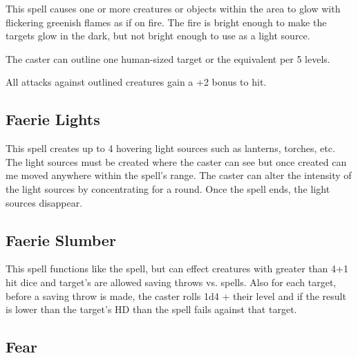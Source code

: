 \begin{multicols*}{2}
This spell causes one or more creatures or objects within the area to glow with flickering greenish flames as if on fire. The fire is bright enough to make the targets glow in the dark, but not bright enough to use as a light source.

The caster can outline one human-sized target or the equivalent per 5 levels.

All attacks against outlined creatures gain a +2 bonus to hit.

\subsection{Faerie Lights}\label{spell:Faerie Lights}

This spell creates up to 4 hovering light sources such as lanterns, torches, etc. The light sources must be created where the caster can see but once created can me moved anywhere within the spell's range. The caster can alter the intensity of the light sources by concentrating for a round. Once the spell ends, the light sources disappear.

\subsection{Faerie Slumber}\label{spell:Faerie Slumber}

This spell functions like the  spell, but can effect creatures with greater than 4+1 hit dice and target's are allowed saving throws vs. spells. Also for each target, before a saving throw is made, the caster rolls 1d4 + their level and if the result is lower than the target's HD than the spell fails against that target.

\subsection{Fear}\label{spell:Fear}
\end{multicols*}
